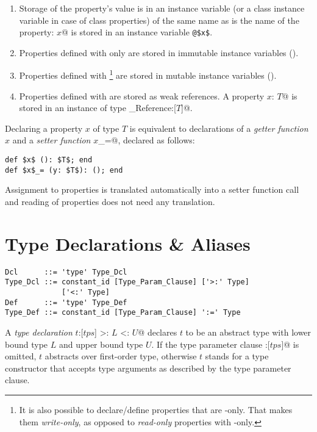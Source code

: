 \begin{enumerate}
\item 
Storage of the property's value is in an instance variable (or a class instance variable in case of class properties) of the same name as is the name of the property: \lstinline@property $x$@ is stored in an instance variable \lstinline+@$x$+. 

\item
Properties defined with only  are stored in immutable instance variables (). 

\item
Properties defined with \footnote{It is also possible to declare/define properties that are -only. That makes them {\em write-only}, as opposed to {\em read-only} properties with -only.} are stored in mutable instance variables (). 

\item
Properties defined with  are stored as weak references. A property \lstinline@property $x$: $T$@ is stored in an instance of type \lstinline@Weak_Reference:[$T$]@. 

\end{enumerate}

Declaring a property $x$ of type $T$ is equivalent to declarations of a {\em getter function} $x$ and a {\em setter function} \lstinline@$x$_=@, declared as follows:

\begin{lstlisting}
def $x$ (): $T$; end
def $x$_= (y: $T$): (); end
\end{lstlisting}

Assignment to properties is translated automatically into a setter function call and reading of properties does not need any translation. 

\section{Type Declarations \& Aliases}

\syntax\begin{lstlisting}
Dcl      ::= 'type' Type_Dcl
Type_Dcl ::= constant_id [Type_Param_Clause] ['>:' Type] 
             ['<:' Type]
Def      ::= 'type' Type_Def
Type_Def ::= constant_id [Type_Param_Clause] ':=' Type
\end{lstlisting}

A {\em type declaration} \lstinline@type $t$:[$tps$] >: $L$ <: $U$@ declares $t$ to be an abstract type with lower bound type $L$ and upper bound type $U$. If the type parameter clause \lstinline@:[$tps$]@ is omitted, $t$ abstracts over first-order type, otherwise $t$ stands for a type constructor that accepts type arguments as described by the type parameter clause. 

